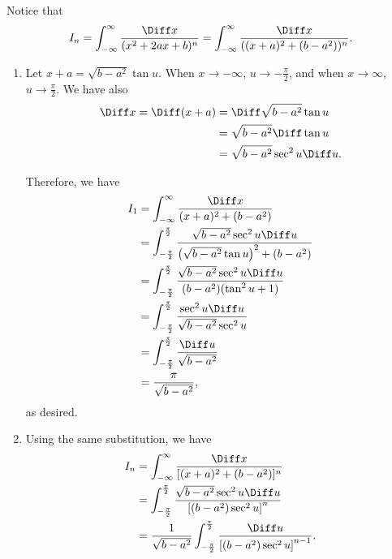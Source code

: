\Question{\currfilebase}

Notice that
\[
    I_n = \int_{-\infty}^{\infty} \frac{\Diff x}{(x^2 + 2ax + b)^n} = \int_{-\infty}^{\infty} \frac{\Diff x}{((x+a)^2 + (b - a^2))^n}.
\]

\begin{enumerate}
    \item Let \(x + a = \sqrt{b - a^2} \tan u\). When \(x \to -\infty\), \(u \to -\frac{\pi}{2}\), and when \(x \to \infty\), \(u \to \frac{\pi}{2}\). We have also
          \begin{align*}
              \Diff x = \Diff (x+a) & = \Diff \sqrt{b - a^2} \tan u      \\
                                    & = \sqrt{b - a^2} \Diff \tan u      \\
                                    & = \sqrt{b - a^2} \sec^2 u \Diff u.
          \end{align*}

          Therefore, we have
          \begin{align*}
              I_1 & = \int_{-\infty}^{\infty} \frac{\Diff x}{(x+a)^2 + (b - a^2)}                                                                    \\
                  & = \int_{-\frac{\pi}{2}}^{\frac{\pi}{2}} \frac{\sqrt{b - a^2} \sec^2 u \Diff u}{\left(\sqrt{b - a^2} \tan u\right)^2 + (b - a^2)} \\
                  & = \int_{-\frac{\pi}{2}}^{\frac{\pi}{2}} \frac{\sqrt{b - a^2} \sec^2 u \Diff u}{(b - a^2)(\tan^2 u + 1)}                          \\
                  & = \int_{-\frac{\pi}{2}}^{\frac{\pi}{2}} \frac{\sec^2 u \Diff u}{\sqrt{b - a^2}\sec^2 u}                                          \\
                  & = \int_{-\frac{\pi}{2}}^{\frac{\pi}{2}} \frac{\Diff u}{\sqrt{b - a^2}}                                                           \\
                  & = \frac{\pi}{\sqrt{b - a^2}},
          \end{align*}
          as desired.

    \item Using the same substitution, we have
          \begin{align*}
              I_n & = \int_{-\infty}^{\infty} \frac{\Diff x}{[(x+a)^2 + (b - a^2)]^n}                                                         \\
                  & = \int_{-\frac{\pi}{2}}^{\frac{\pi}{2}} \frac{\sqrt{b - a^2} \sec^2 u \Diff u}{\left[(b - a^2) \sec^2 u\right]^n}         \\
                  & = \frac{1}{\sqrt{b - a^2}} \int_{-\frac{\pi}{2}}^{\frac{\pi}{2}} \frac{\Diff u}{\left[(b - a^2) \sec^2 u\right]^{n - 1}}.
          \end{align*}


\end{enumerate}
